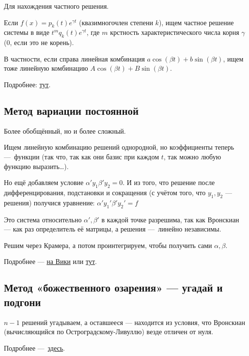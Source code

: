 \documentclass[12pt, a4paper]{article}
\begin{document}
Для нахождения частного решения.

Если $f(x) = p_k(t) e^{\gamma t}$ (квазимногочлен степени $k$),
ищем частное решение системы в виде $t^m q_k(t) e^{\gamma t}$, где $m$ крстность характеристического числа корня $\gamma$ ($0$, если это не корень).

В частности, если справа линейная комбинация $a \cos(βt)+b \sin(βt)$, ищем тоже линейную комбинацию $A \cos(βt)+ B \sin(βt)$.

Подробнее: \href{https://tutorial.math.lamar.edu/Classes/DE/UndeterminedCoefficients.aspx}{тут}.

\subsection{Метод вариации постоянной}

Более обобщённый, но и более сложный.

Ищем линейную комбинацию решений однородной, но коэффициенты теперь — функции (так что, так как они базис при каждом $t$, так можно любую функцию выразить…).

Но ещё добавляем условие $\alpha' y_1 \beta' y_2 = 0$.
И из того, что решение после дифференцирования, подстановки и сокращения (с учётом того, что $y_1, y_2$ — решения) 
получися уравнение: $\alpha' y_1' \beta' y_2' = f$

Это система относительно $\alpha', \beta'$ в каждой точке разрешима, так как Вронскиан — как раз определитель её матрицы, а решения — линейно независимы.

Решим через Крамера, а потом проинтегрируем, чтобы получить сами $\alpha, \beta$.

Подробнее — \href{https://en.wikipedia.org/wiki/Variation_of_parameters}{на Вики} 
или \href{https://tutorial.math.lamar.edu/classes/de/VariationofParameters.aspx}{тут}.

\subsection{Метод «божественного озарения» — угадай и подгони}

$n - 1$ решений угадываем, а оставшееся — находится из условия, 
что Вронскиан (вычисляющийся по Остроградскому-Ливуллю) везде отличен от нуля.

Подробнее — \href{https://ru.wikipedia.org/wiki/%D0%A4%D0%BE%D1%80%D0%BC%D1%83%D0%BB%D0%B0_%D0%9B%D0%B8%D1%83%D0%B2%D0%B8%D0%BB%D0%BB%D1%8F_%E2%80%94_%D0%9E%D1%81%D1%82%D1%80%D0%BE%D0%B3%D1%80%D0%B0%D0%B4%D1%81%D0%BA%D0%BE%D0%B3%D0%BE}{здесь}.
\end{document}
